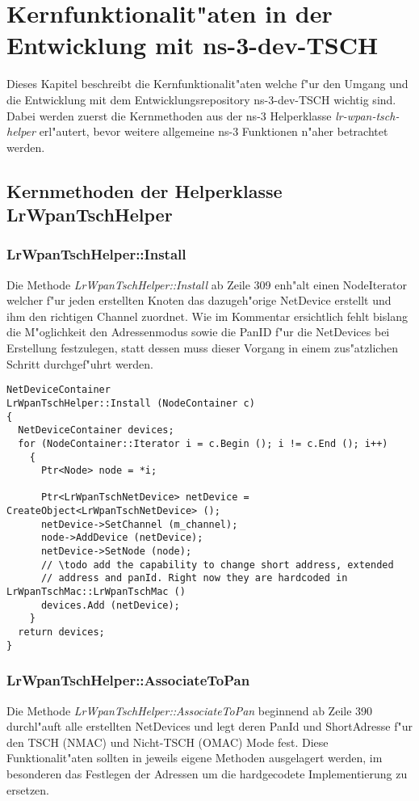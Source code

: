 \clearpage
\section{Kernfunktionalit"aten in der Entwicklung mit ns-3-dev-TSCH}

Dieses Kapitel beschreibt die Kernfunktionalit"aten welche f"ur den Umgang und
die Entwicklung mit dem Entwicklungsrepository ns-3-dev-TSCH wichtig sind.
Dabei werden zuerst die Kernmethoden aus der ns-3 Helperklasse
\textit{lr-wpan-tsch-helper} erl"autert, bevor weitere allgemeine ns-3
Funktionen n"aher betrachtet werden.

\subsection{Kernmethoden der Helperklasse LrWpanTschHelper}

\subsubsection{LrWpanTschHelper::Install}
Die Methode \textit{LrWpanTschHelper::Install} ab Zeile 309 enh"alt einen
NodeIterator welcher f"ur jeden erstellten Knoten das dazugeh"orige NetDevice
erstellt und ihm den richtigen Channel zuordnet. Wie im Kommentar ersichtlich
fehlt bislang die M"oglichkeit den Adressenmodus sowie die PanID f"ur
die NetDevices bei Erstellung festzulegen, statt dessen muss dieser Vorgang
in einem zus"atzlichen Schritt durchgef"uhrt werden.

\begin{lstlisting}[frame=single]
NetDeviceContainer
LrWpanTschHelper::Install (NodeContainer c)
{
  NetDeviceContainer devices;
  for (NodeContainer::Iterator i = c.Begin (); i != c.End (); i++)
    {
      Ptr<Node> node = *i;

      Ptr<LrWpanTschNetDevice> netDevice = CreateObject<LrWpanTschNetDevice> ();
      netDevice->SetChannel (m_channel);
      node->AddDevice (netDevice);
      netDevice->SetNode (node);
      // \todo add the capability to change short address, extended
      // address and panId. Right now they are hardcoded in LrWpanTschMac::LrWpanTschMac ()
      devices.Add (netDevice);
    }
  return devices;
}
\end{lstlisting}

\subsubsection{LrWpanTschHelper::AssociateToPan}
\label{helper_associatetopan}
Die Methode \textit{LrWpanTschHelper::AssociateToPan} beginnend ab Zeile 390
durchl"auft alle erstellten NetDevices und legt deren PanId und ShortAdresse
f"ur den TSCH (NMAC) und Nicht-TSCH (OMAC) Mode fest. Diese Funktionalit"aten
sollten in jeweils eigene Methoden ausgelagert werden, im besonderen das
Festlegen der Adressen um die hardgecodete Implementierung zu ersetzen.

